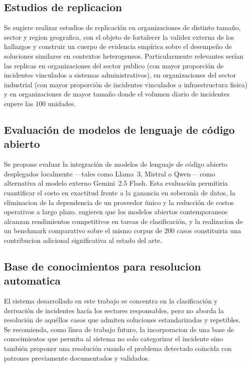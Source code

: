 \subsection{Estudios de replicacion}

Se sugiere realizar estudios de replicación en organizaciones de distinto tamaño, sector y region geografica, con el objeto de fortalecer la validez externa de los hallazgos y construir un cuerpo de evidencia empírica sobre el desempeño de soluciones similares en contextos heterogeneos. Particularmente relevantes serían las replicas en organizaciones del sector publico (con mayor proporción de incidentes vinculados a sistemas administrativos), en organizaciones del sector industrial (con mayor proporción de incidentes vinculados a infraestructura fisica) y en organizaciones de mayor tamaño donde el volumen diario de incidentes supere las 100 unidades.

\subsection{Evaluación de modelos de lenguaje de código abierto}

Se propone evaluar la integración de modelos de lenguaje de código abierto desplegados localmente ---tales como Llama~3, Mistral o Qwen--- como alternativa al modelo externo Gemini~2.5 Flash. Esta evaluación permitiria cuantificar el costo en exactitud frente a la ganancia en soberanía de datos, la eliminacion de la dependencia de un proveedor único y la reducción de costos operativos a largo plazo. \textcite{Touvron2023_llama2} sugieren que los modelos abiertos contemporaneos alcanzan rendimientos competitivos en tareas de clasificación, y la realizacion de un benchmark comparativo sobre el mismo corpus de 200 casos constituiria una contribucion adicional significativa al estado del arte.

\subsection{Base de conocimientos para resolucion automatica}

El sistema desarrollado en este trabajo se concentra en la clasificación y derivación de incidentes hacía los sectores responsables, pero no aborda la resolución de aquéllos casos que admiten soluciones estandarizadas y repetibles. Se recomienda, como línea de trabajo futuro, la incorporacion de una base de conocimientos que permita al sistema no solo categorizar el incidente sino también proponer una resolución cuando el problema detectado coincida con patrones previamente documentados y validados.

